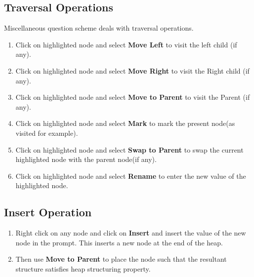 \documentclass[aps,letterpaper,12pt]{revtex4}
\begin{document}
\subsection{Traversal Operations}
Miscellaneous question scheme deals with traversal operations.
\begin{enumerate}
\item Click on highlighted node and select \textbf{Move Left} to visit the left child (if any).
\item Click on highlighted node and select \textbf{Move Right} to visit the Right child (if any).
\item Click on highlighted node and select \textbf{Move to Parent} to visit the Parent (if any).
\item Click on highlighted node and select \textbf{Mark} to mark the present node(as visited for example).
\item Click on highlighted node and select \textbf{Swap to Parent} to swap the current highlighted node with the parent node(if any).
\item Click on highlighted node and select \textbf{Rename} to enter the new value of the highlighted node.
\end{enumerate}


\subsection{Insert Operation}
\begin{enumerate}
\item Right click on any node and click on \textbf{Insert} and insert the value of the new node in the prompt. This inserts a new node at the end of the heap.
\item Then use \textbf{Move to Parent} to place the node such that the resultant structure satisfies heap structuring property. 
\end{enumerate}
\end{document}
